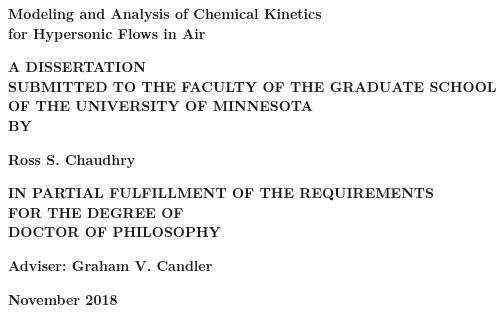 
\frontmatter




\begin{titlepage}
   \centering
   \vspace*{1 cm}

   {\LARGE \bfseries
      Modeling and Analysis of Chemical Kinetics \\[2 pt]         %
      for Hypersonic Flows in Air}
   \vspace{2 cm}

   {\bfseries A DISSERTATION \\
      SUBMITTED TO THE FACULTY OF THE GRADUATE SCHOOL \\
      OF THE UNIVERSITY OF MINNESOTA \\
      BY}
   \vspace{3 cm}

   {\Large\bfseries Ross S. Chaudhry}
   \vspace{3 cm}

   {\bfseries IN PARTIAL FULFILLMENT OF THE REQUIREMENTS \\
      FOR THE DEGREE OF \\
      DOCTOR OF PHILOSOPHY}
   \vspace{2 cm}

   {\bfseries Adviser: Graham V. Candler}
   \vspace{2 cm}

   {\bfseries November 2018}
\end{titlepage}

